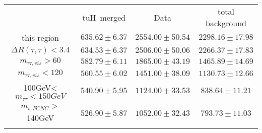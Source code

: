 \begin{tabular}{cccc} \toprule\toprule
 & tuH~merged & Data & total background\\
 this region & $635.62\pm6.37$ & $2554.00\pm50.54$ & $2298.16\pm17.98$\\
$\Delta R(\tau,\tau)<3.4$ & $634.53\pm6.37$ & $2506.00\pm50.06$ & $2266.37\pm17.83$\\
$m_{\tau\tau,vis}>60$ & $582.79\pm6.11$ & $1865.00\pm43.19$ & $1465.89\pm14.69$\\
$m_{\tau\tau,vis}<120$ & $560.55\pm6.02$ & $1451.00\pm38.09$ & $1130.73\pm12.66$\\
100GeV<$m_{\tau\tau}<150GeV$ & $540.90\pm5.95$ & $1124.00\pm33.53$ & $838.64\pm11.21$\\
$m_{t,FCNC}>$140GeV & $526.90\pm5.87$ & $1052.00\pm32.43$ & $793.73\pm11.03$\\
\bottomrule\bottomrule\\
\end{tabular}
